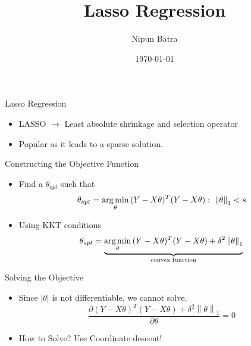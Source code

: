 \documentclass{beamer}
\title{Lasso Regression}
\date{\today}
\author{Nipun Batra}
\institute{IIT Gandhinagar}
\newcommand{\norm}[1]{\left\lVert#1\right\rVert}
\begin{document}
  \maketitle
  
  
  
  

\begin{frame}{Lasso Regression}
\begin{itemize}[<+->]
	
	
	\item LASSO $\longrightarrow$ Least absolute shrinkage and selection operator
	\item Popular as it leads to a sparse solution.
	
\end{itemize}
\end{frame}

\begin{frame}{Constructing the Objective Function}
\begin{itemize}[<+->]

\item Find a $\theta_{opt}$ such that  \begin{equation}    \theta_{opt} =  \argmin_{\theta} {(Y-X\theta)^T(Y-X\theta)} : \ \norm{\theta}_1<s \end{equation}
\item Using KKT conditions
\begin{equation}
    \theta_{opt} = \underbrace{\argmin_{\theta}{(Y-X\theta)^T(Y-X\theta) + \delta^2\norm{\theta}_1}}_\text{convex function}
\end{equation}
	
\end{itemize}


\end{frame}

\begin{frame}{Solving the Objective}
\begin{itemize}[<+->]

\item Since $|\theta|$ is not differentiable, we cannot solve,  \begin{equation}    \frac{\partial {(Y-X\theta)^T(Y-X\theta) + \delta^2\norm{\theta}_1}}{\partial \theta} = 0 \end{equation}

\item How to Solve?
Use Coordinate descent!
\end{itemize}

\end{frame}
\end{document}
